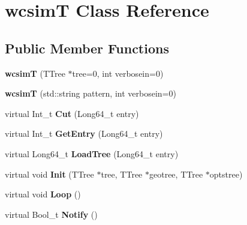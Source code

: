 \hypertarget{classwcsimT}{\section{wcsim\-T Class Reference}
\label{classwcsimT}
}
\subsection*{Public Member Functions}
\begin{DoxyCompactItemize}
\item 
\hypertarget{classwcsimT_a6366d7ce15c5f09b4182cb39fe30f91c}{{\bfseries wcsim\-T} (T\-Tree $\ast$tree=0, int verbosein=0)}\label{classwcsimT_a6366d7ce15c5f09b4182cb39fe30f91c}

\item 
\hypertarget{classwcsimT_a9cfff7ab16770bb3c19b97f3900fcae2}{{\bfseries wcsim\-T} (std\-::string pattern, int verbosein=0)}\label{classwcsimT_a9cfff7ab16770bb3c19b97f3900fcae2}

\item 
\hypertarget{classwcsimT_ab62fecfeb3e5dff74bfcd76ac57fc519}{virtual Int\-\_\-t {\bfseries Cut} (Long64\-\_\-t entry)}\label{classwcsimT_ab62fecfeb3e5dff74bfcd76ac57fc519}

\item 
\hypertarget{classwcsimT_a5058b69efd9adefc0e0161369b2da03b}{virtual Int\-\_\-t {\bfseries Get\-Entry} (Long64\-\_\-t entry)}\label{classwcsimT_a5058b69efd9adefc0e0161369b2da03b}

\item 
\hypertarget{classwcsimT_a31d71172212be442f627beab99947ee4}{virtual Long64\-\_\-t {\bfseries Load\-Tree} (Long64\-\_\-t entry)}\label{classwcsimT_a31d71172212be442f627beab99947ee4}

\item 
\hypertarget{classwcsimT_af7c8d579dc79eb6e63f0226a4a2e5b1c}{virtual void {\bfseries Init} (T\-Tree $\ast$tree, T\-Tree $\ast$geotree, T\-Tree $\ast$optstree)}\label{classwcsimT_af7c8d579dc79eb6e63f0226a4a2e5b1c}

\item 
\hypertarget{classwcsimT_a0bdc362c8cf801cbb1310ecf1bb182fc}{virtual void {\bfseries Loop} ()}\label{classwcsimT_a0bdc362c8cf801cbb1310ecf1bb182fc}

\item 
\hypertarget{classwcsimT_a268e70c2e92740d4f0e1f7a54a5ade0f}{virtual Bool\-\_\-t {\bfseries Notify} ()}\label{classwcsimT_a268e70c2e92740d4f0e1f7a54a5ade0f}


\end{DoxyCompactItemize}
